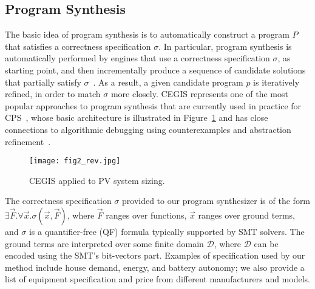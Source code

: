 \subsection{Program Synthesis}
\label{sec:ProgramSynthesis}

The basic idea of program synthesis is to automatically construct a program $P$ that satisfies a correctness specification $\sigma$. In particular, program synthesis is automatically performed by engines that use a correctness specification $\sigma$, as starting point, and then incrementally produce a sequence of candidate solutions that partially satisfy $\sigma$~\cite{Abateetal2017}. As a result, a given candidate program $p$ is iteratively refined, in order to match $\sigma$ more closely. CEGIS represents one of the most popular approaches to program synthesis that are currently used in practice for CPS~\cite{Abateetal2017}, whose basic architecture is illustrated in Figure~\ref{Counter-Example-Guided-Inductive-Synthesis} and has close connections to algorithmic debugging using counterexamples and abstraction refinement~\cite{Alur}. 

\begin{figure}[h]
	\centering
	\texttt{[image: fig2\_rev.jpg]}
	\caption{CEGIS applied to PV system sizing.}
	\label{Counter-Example-Guided-Inductive-Synthesis}
\end{figure}

The correctness specification $\sigma$ provided to our program synthesizer is of the form $\exists \vec{F} .  \forall \vec{x}.  \sigma(\vec{x}, \vec{F})$, where $\vec{F}$ ranges over functions, $\vec{x}$ ranges over ground terms, and $\sigma$ is a quantifier-free (QF) formula typically supported by SMT solvers. The ground terms are interpreted over some finite domain $\mathcal{D}$, where $\mathcal{D}$ can be encoded using the SMT's bit-vectors part. Examples of specification used by our method include house demand, energy, and battery autonomy; we also provide a list of equipment specification and price from different manufacturers and models.


